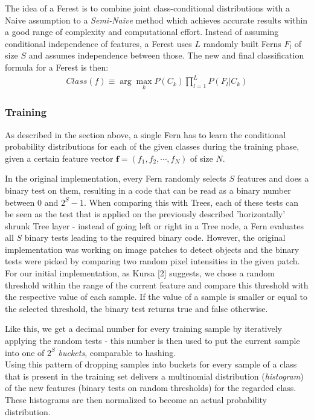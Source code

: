 \documentclass[twocolumn]{article}
\begin{document}
The idea of a Ferest is to combine joint class-conditional distributions with a Naive assumption to a \textit{Semi-Naive} method which achieves accurate results within a good range of complexity and computational effort. Instead of assuming conditional independence of features, a Ferest uses $L$ randomly built Ferns $F_l$ of size $S$ and assumes independence between those. The new and final classification formula for a Ferest is then:
\begin{align*}
Class(f) \equiv \arg\max_k P(C_k) \prod_{l=1}^L P(F_l\vert C_k)
\end{align*}

\subsubsection{Training}

As described in the section above, a single Fern has to learn the conditional probability distributions for each of the given classes during the training phase, given a certain feature vector $\mathbf{f} = (f_1,f_2, \cdots, f_N)$ of size $N$.

In the original implementation, every Fern randomly selects $S$ features and does a binary test on them, resulting in a code that can be read as a binary number between $0$ and $2^S-1$. When comparing this with Trees, each of these tests can be seen as the test that is applied on the previously described 'horizontally' shrunk Tree layer - instead of going left or right in a Tree node, a Fern evaluates all $S$ binary tests leading to the required binary code. However, the original implementation was working on image patches to detect objects and the binary tests were picked by comparing two random pixel intensities in the given patch. For our initial implementation, as Kursa [2] suggests, we chose a random threshold within the range of the current feature and compare this threshold with the respective value of each sample. If the value of a sample is smaller or equal to the selected threshold, the binary test returns true and false otherwise.

Like this, we get a decimal number for every training sample by iteratively applying the random tests - this number is then used to put the current sample into one of $2^S$ \textit{buckets}, comparable to hashing.\\
Using this pattern of dropping samples into buckets for every sample of a class that is present in the training set delivers a multinomial distribution (\textit{histogram}) of the new features (binary tests on random thresholds) for the regarded class. These histograms are then normalized to become an actual probability distribution.
\end{document}
